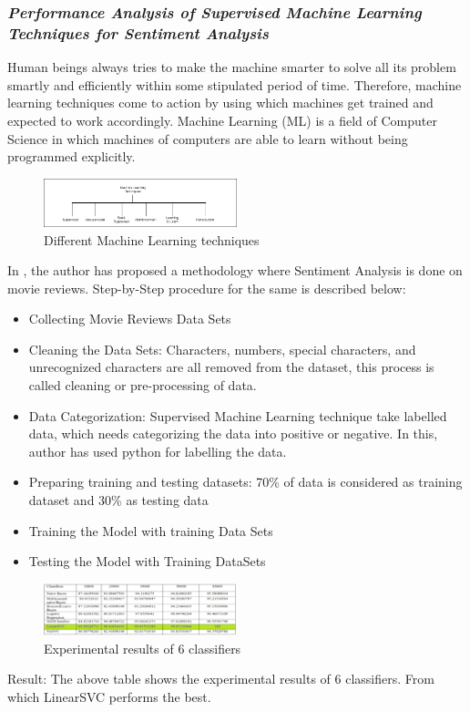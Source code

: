 \documentclass[conference]{IEEEtran}
\begin{document}
\subsubsection{\textit{Performance Analysis of Supervised Machine Learning Techniques for Sentiment Analysis\cite{b10}}}
Human beings always tries to make the machine smarter to solve all its problem smartly and efficiently within some stipulated period of time. Therefore, machine learning techniques come to action by using which machines get trained and expected to work accordingly. Machine Learning (ML) is a field of Computer Science in which machines of computers are able to learn without being programmed explicitly. \\
\begin{figure}[!ht]
	\centering
	\includegraphics[width=0.5\textwidth]{tech.png}
	\caption{Different Machine Learning techniques}
\end{figure}
In \cite{b10}, the author has proposed a methodology where Sentiment Analysis is done on movie reviews. Step-by-Step procedure for the same is described below:
\begin{itemize}
	\item Collecting Movie Reviews Data Sets
	\item Cleaning the Data Sets: Characters, numbers, special characters, and unrecognized characters are all removed from the dataset, this process is called cleaning or pre-processing of data.
	\item Data Categorization: Supervised Machine Learning technique take labelled data, which needs categorizing the data into positive or negative. In this, author has used python for labelling the data.
	\item Preparing training and testing datasets: 70\% of data is considered as training dataset and 30\% as testing data
 	\item Training the Model with training Data Sets
	\item Testing the Model with Training DataSets
\end{itemize}

	\begin{figure}[!ht]
	\centering
	\includegraphics[width=0.5\textwidth]{result.png}
	\caption{Experimental results of 6 classifiers}
\end{figure}
Result: The above table shows the experimental results of 6 classifiers. From which LinearSVC performs the best.
\end{document}
